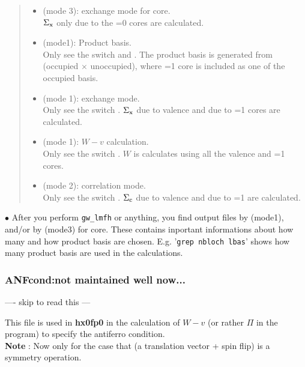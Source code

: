 \documentclass[a4paper,10pt,epsf,fleqn]{article}
\begin{document}
\begin{quote}
\begin{itemize}
\item 
{}(mode 3): exchange mode for core.\\
$\Sigma_{\rm x}$ only due to the =0 cores are calculated.

\item 
{} (mode1): Product basis.\\
Only see the switch  and .
The product basis is generated from (occupied $\times$ unoccupied), 
where =1 core is included as one of the occupied basis.

\item 
{} (mode 1): exchange mode.\\
Only see the switch .
$\Sigma_{\rm x}$ due to valence and due to =1 cores
are calculated.

\item 
{} (mode 1): $W-v$ calculation.\\
Only see the switch .
$W$ is calculates using all the valence and =1 cores.

\item 
{} (mode 2): correlation mode.\\
Only see the switch .
$\Sigma_{\rm c}$ due to valence and due to =1 are calculated.

\end{itemize}

\end{quote}

\noindent $\bullet$ After you perform \verb#gw_lmfh# or anything,
you find output files  by  (mode1), and/or 
by  (mode3) for core. These contains inportant informations
about how many and how product basis are chosen. 
E.g. '\verb#grep nbloch lbas#' shows how many product basis are used in the calculations.



\subsubsection{ANFcond:not maintained well now...} 
---- skip to read this ---

This file is used in {\bf hx0fp0} in the calculation of $W-v$ 
(or rather $\Pi$ in the program) to specify the antiferro condition.\\

{\bf Note} : Now only for the case that 
(a translation vector + spin flip) is a symmetry operation.\\
\end{document}

